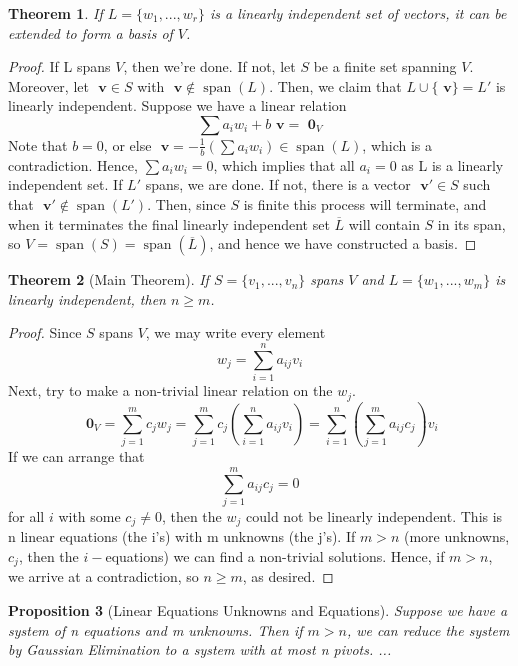 \documentclass[12pt]{article}
\newtheorem{thm}{Theorem}[section]
\newtheorem{prop}[thm]{Proposition}
\theoremstyle{definition}
\theoremstyle{remark}
\numberwithin{equation}{section}
\newcommand\B[1]{\textbf{ #1}}
\DeclareMathOperator{\spn}{span}
\begin{document}
\begin{thm}
        If $L = \{w_1,...,w_r\}$ is a linearly independent set of vectors, it can be extended to form a basis of $V$.
\end{thm}
\begin{proof}
        If L spans $V$, then we're done. If not, let $S$ be a finite set spanning $V$. Moreover, let $\B{v} \in S$ with $\B{v} \notin \spn(L)$. Then, we claim that $L\cup \{\B{v}\} = L'$ is linearly independent. Suppose we have a linear relation $$\sum a_iw_i + b\B{v} = \B{0}_V$$ Note that $b = 0$, or else $\B{v} = -\frac{1}{b}(\sum a_iw_i) \in \spn(L)$, which is a contradiction. Hence, $\sum a_iw_i = 0$, which implies that all $a_i = 0$ as L is a linearly independent set. If $L'$ spans, we are done. If not, there is a vector $\B{v}' \in S$ such that $\B{v}' \notin\spn(L')$. Then, since $S$ is finite this process will terminate, and when it terminates the final linearly independent set $\overline{L}$ will contain $S$ in its span, so $V = \spn(S) = \spn(\overline{L})$, and hence we have constructed a basis.
\end{proof}

\vspace{15pt}

\begin{thm}[Main Theorem]
        If $S = \{v_1,...,v_n\}$ spans $V$ and $L = \{w_1,...,w_m\}$ is linearly independent, then $n \geq m$.
\end{thm}
\begin{proof}
        Since $S$ spans $V$, we may write every element $$w_j = \sum\limits_{i=1}^na_{ij}v_i$$ Next, try to make a non-trivial linear relation on the $w_j$. $$\B{0}_V = \sum\limits_{j=1}^mc_jw_j = \sum\limits_{j=1}^mc_j\left(\sum\limits_{i=1}^na_{ij}v_i\right) = \sum\limits_{i=1}^n\left(\sum\limits_{j=1}^ma_{ij}c_j\right)v_i$$ If we can arrange that $$\sum\limits_{j=1}^ma_{ij}c_j = 0$$ for all $i$ with some $c_j \neq 0$, then the $w_j$ could not be linearly independent. This is n linear equations (the i's) with m unknowns (the j's). If $m > n$ (more unknowns, $c_j$, then the $i-$equations) we can find a non-trivial solutions. Hence, if $m > n$, we arrive at a contradiction, so $n \geq m$, as desired.
\end{proof}

\vspace{15pt}

\begin{prop}[Linear Equations Unknowns and Equations]
        Suppose we have a system of n equations and m unknowns. Then if $m > n$, we can reduce the system by Gaussian Elimination to a system with at most n pivots. ...
\end{prop}
\end{document}
